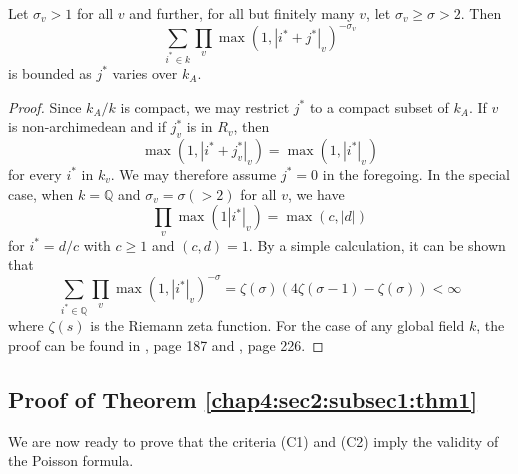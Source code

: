 \begin{lemma}\label{chap4:sec6:subsec3:lem8} %
  Let $\sigma_{v}>1$ for all $v$ and further, for all but finitely many
  $v$, let $\sigma_{v}\geq \sigma>2$. Then
  $$
  \sum_{i^{\ast}\in
    k}\prod_{v}\max(1,|i^{\ast}+j^{\ast}|_{v})^{-\sigma_{v}}
  $$
  is bounded as $j^{\ast}$ varies over $k_{A}$.
\end{lemma}

\begin{proof}
Since $k_{A}/k$ is compact, we may restrict $j^{\ast}$ to a compact
subset of $k_{A}$. If $v$ is non-archimedean and if $j^{\ast}_{v}$ is
in $R_{v}$, then
$$
\max(1,|i^{\ast}+j^{\ast}_{v}|_{v})=\max(1,|i^{\ast}|_{v})
$$
for every $i^{\ast}$ in $k_{v}$. We may therefore assume $j^{\ast}=0$
in the foregoing. In the special case, when $k=\mathbb{Q}$ and
$\sigma_{v}=\sigma(>2)$ for all $v$, we have
$$
\prod_{v}\max (1|i^{\ast}|_{v})=\max(c,|d|)
$$
for $i^{\ast}=d/c$ with $c\geq 1$ and $(c,d)=1$. By a simple
calculation, it can be shown that
$$
\sum_{i^{\ast}\in\mathbb{Q}}\prod_{v}\max(1,|i^{\ast}|_{v})^{-\sigma}=\zeta(\sigma)(4\zeta(\sigma-1)-\zeta(\sigma))<\infty
$$
where $\zeta(s)$ is the Riemann zeta function. For the case of any
global field $k$, the proof can be found in \cite{Igu 1}, page {187}
and \cite{Igu 3}, page {226}. 
\end{proof}

\subsection{Proof of Theorem
  \ref{chap4:sec2:subsec1:thm1}}\label{chap4:sec6:subsec4} %

We are now ready to prove that the criteria (C1) and (C2) imply the
validity of the Poisson formula.


